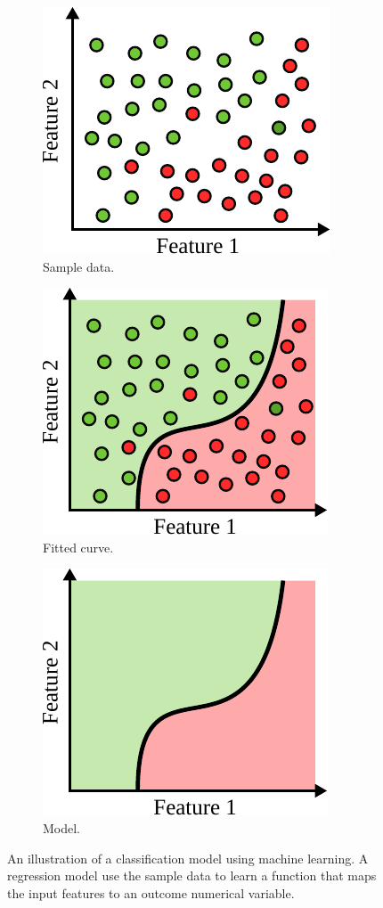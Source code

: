 \begin{figure}[h]
  \centering
  \begin{subfigure}{.32\textwidth}
    \center
    \includegraphics[scale=0.8]{src/background/figs/ml-classifier-sample}
    \caption{Sample data.}
    \label{fig:ml-classifier-sample}
  \end{subfigure}
  \begin{subfigure}{.32\textwidth}
    \center
    \includegraphics[scale=0.8]{src/background/figs/ml-classifier-fitted}
    \caption{Fitted curve.}
    \label{fig:ml-classifier-fitted}
  \end{subfigure}
  \begin{subfigure}{.32\textwidth}
    \center
    \includegraphics[scale=0.8]{src/background/figs/ml-classifier-model}
    \caption{Model.}
    \label{fig:ml-classifier-model}
  \end{subfigure}
  \caption{
    An illustration of a classification model using machine learning.
    A regression model use the sample data to learn a function that maps the input features to an outcome numerical variable.
  }
  \label{fig:ml-classifier}
\end{figure}


